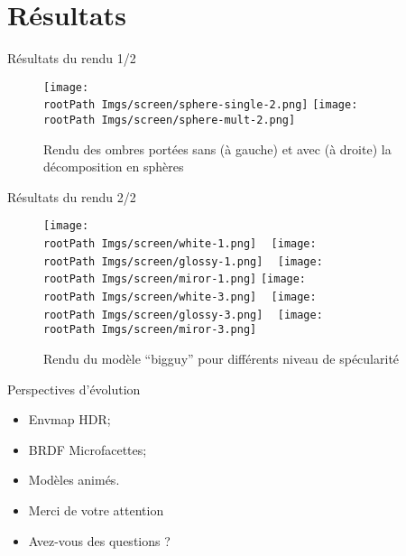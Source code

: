 \documentclass{beamer}
\newcommand*{\rootPath}{}
\begin{document}
\section{Résultats}

\begin{frame}{Résultats du rendu 1/2}
	\begin{figure}
		\centering
			\texttt{[image: \\rootPath Imgs/screen/sphere-single-2.png]}
			\texttt{[image: \\rootPath Imgs/screen/sphere-mult-2.png]}
		\caption{Rendu des ombres portées sans (à gauche) et avec (à droite) la décomposition en sphères}
	\end{figure}
\end{frame}

\begin{frame}{Résultats du rendu 2/2}
	\begin{figure}
		\centering
				\texttt{[image: \\rootPath Imgs/screen/white-1.png]}
				~
				\texttt{[image: \\rootPath Imgs/screen/glossy-1.png]}
				~
				\texttt{[image: \\rootPath Imgs/screen/miror-1.png]}
				\vspace{0.2cm}
				\texttt{[image: \\rootPath Imgs/screen/white-3.png]}
				~
				\texttt{[image: \\rootPath Imgs/screen/glossy-3.png]}
				~
				\texttt{[image: \\rootPath Imgs/screen/miror-3.png]}
			
		\caption{Rendu du modèle “bigguy” pour différents niveau de spécularité}
	\end{figure}
\end{frame}

\begin{frame}{Perspectives d'évolution}
	\begin{itemize}
		\item Envmap HDR;
		\item BRDF Microfacettes;
		\item Modèles animés.
	\end{itemize}
\end{frame}


\begin{frame}
	\begin{itemize}
		\item Merci de votre attention
		\item Avez-vous des questions ?
	\end{itemize}
\end{frame}
\end{document}

